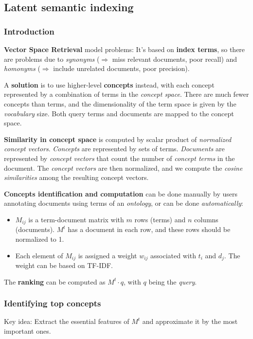 \subsection{Latent semantic indexing} %
\label{sub:latent_semantic_indexing}
  \subsubsection{Introduction} %
  \label{ssub:introduction}
    \textbf{Vector Space Retrieval} model problems: It's based on \textbf{index terms}, so there are problems due to \emph{synonyms} ($\Rightarrow$ miss relevant documents, poor recall) and \emph{homonyms} ($\Rightarrow$ include unrelated documents, poor precision).

    A \textbf{solution} is to use higher-level \textbf{concepts} instead, with each concept represented by a combination of terms in the \emph{concept space}. There are much fewer concepts than terms, and the dimensionality of the term space is given by the \emph{vocabulary} size. Both query terms and documents are mapped to the concept space.

    \textbf{Similarity in concept space} is computed by scalar product of \emph{normalized concept vectors}. \emph{Concepts} are represented by sets of terms. \emph{Documents} are represented by \emph{concept vectors} that count the number of \emph{concept terms} in the document. The \emph{concept vectors} are then normalized, and we compute the \emph{cosine similarities} among the resulting concept vectors.

    \textbf{Concepts identification and computation} can be done manually by users annotating documents using terms of an \emph{ontology}, or can be done \emph{automatically}:
    \begin{itemize}
      \item $M_{ij}$ is a term-document matrix with $m$ rows (terms) and $n$ columns (documents). $M^t$ has a document in each row, and these rows should be normalized to 1.
      \item Each element of $M_{ij}$ is assigned a weight $w_{ij}$ associated with $t_{i}$ and $d_j$. The weight can be based on TF-IDF.
    \end{itemize}

    The \textbf{ranking} can be computed as $M^t \cdot q$, with $q$ being the \emph{query}.

  \subsubsection{Identifying top concepts} %
  \label{ssub:identifying_top_concepts}
    Key idea: Extract the essential features of $M^t$ and approximate it by the most important ones.

